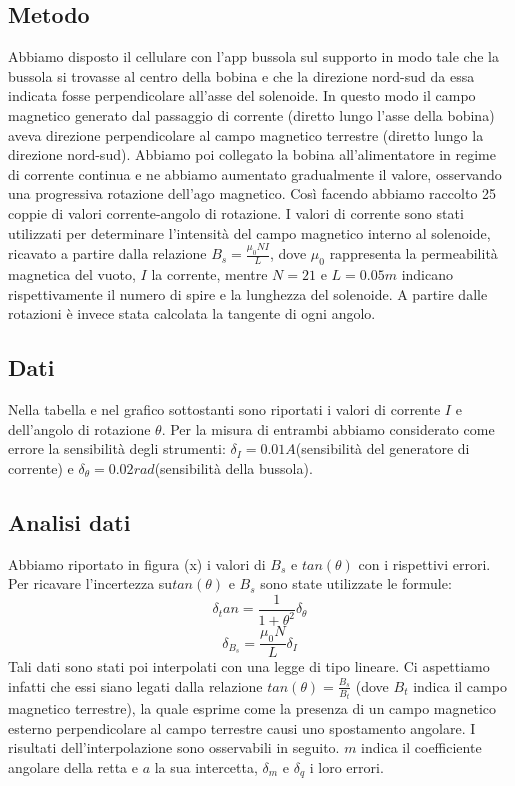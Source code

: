 \documentclass[a4paper]{article}
\begin{document}
\subsection{Metodo}
Abbiamo disposto il cellulare con l’app bussola sul supporto in modo tale che la bussola si trovasse al centro della bobina e che la direzione nord-sud da essa indicata
fosse perpendicolare all'asse del solenoide. In questo modo il campo magnetico generato dal passaggio di corrente (diretto lungo l'asse della bobina) aveva direzione perpendicolare
al campo magnetico terrestre (diretto lungo la direzione nord-sud). Abbiamo poi collegato la bobina all’alimentatore in regime di corrente continua e ne abbiamo aumentato gradualmente il valore,
osservando una progressiva rotazione dell'ago magnetico. Così facendo abbiamo raccolto 25 coppie di valori corrente-angolo di rotazione.
I valori di corrente sono stati utilizzati per determinare l'intensità del campo magnetico interno al solenoide, ricavato a partire dalla relazione \( B_s = \frac {\mu_0NI}{L} \),
dove \(\mu_0\) rappresenta la permeabilità magnetica del vuoto, \( \mathit{I} \) la corrente,
mentre \( \mathit{N=21} \) e \( \mathit{L=0.05m} \) indicano rispettivamente il numero di spire e la lunghezza del solenoide.
A partire dalle rotazioni è invece stata calcolata la tangente di ogni angolo.
\subsection{Dati}
Nella tabella e nel grafico sottostanti sono riportati i valori di corrente \( \mathit{I} \) e dell'angolo di rotazione \(\theta\).
Per la misura di entrambi abbiamo considerato come errore la sensibilità degli strumenti:
\( \mathit{\delta_I=0.01A} \)(sensibilità del generatore di corrente) e \( \mathit{\delta_\theta=0.02rad} \)(sensibilità della bussola).
\subsection{Analisi dati}
Abbiamo riportato in figura (x) i valori di \( \mathit{B_s} \) e \( \mathit{tan(\theta)} \) con i rispettivi errori.
Per ricavare l'incertezza su\( \mathit{tan(\theta)} \) e \( \mathit{B_s} \) sono state utilizzate le formule:
\[ \delta_tan = \frac {1}{1+\theta^2}\delta_\theta \]
\[ \delta_B_s = \frac {\mu_0N}{L}\delta_I \]
Tali dati sono stati poi interpolati con una legge di tipo lineare.
Ci aspettiamo infatti che essi siano legati dalla relazione \( tan(\theta) = \frac {B_s}{B_t} \) (dove \( \mathit{B_t} \) indica il campo magnetico terrestre),
la quale esprime come la presenza di un campo magnetico esterno perpendicolare al campo terrestre causi uno spostamento angolare.
I risultati dell'interpolazione sono osservabili in seguito.
\( \mathit{m} \) indica il coefficiente angolare della retta e \( \mathit{a} \) la sua intercetta,
\( \mathit{\delta_m} \) e \( \mathit{\delta_q} \) i loro errori.
\end{document}
